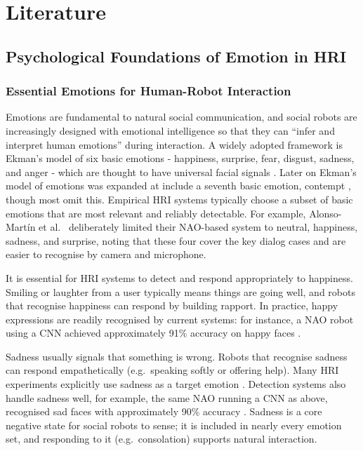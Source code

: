 \chapter{Literature}

\section{Psychological Foundations of Emotion in HRI}

\subsection{Essential Emotions for Human-Robot Interaction}

Emotions are fundamental to natural social communication, and social robots are increasingly designed with emotional intelligence so that they can ``infer and interpret human emotions'' during interaction. A widely adopted framework is Ekman's model of six basic emotions - happiness, surprise, fear, disgust, sadness, and anger - which are thought to have universal facial signals \cite{Reyes2019-go}. Later on Ekman's model of emotions was expanded at include a seventh basic emotion, contempt \cite{Matsumoto1992-jf}, though most omit this. Empirical HRI systems typically choose a subset of basic emotions that are most relevant and reliably detectable. For example, Alonso-Martín et al.\ \cite{Alonso-Martin2013-cv} deliberately limited their NAO-based system to neutral, happiness, sadness, and surprise, noting that these four cover the key dialog cases and are easier to recognise by camera and microphone.

It is essential for HRI systems to detect and respond appropriately to happiness. Smiling or laughter from a user typically means things are going well, and robots that recognise happiness can respond by building rapport. In practice, happy expressions are readily recognised by current systems: for instance, a NAO robot using a CNN achieved approximately 91\% accuracy on happy faces \cite{Filippini2021-ni}.

Sadness usually signals that something is wrong. Robots that recognise sadness can respond empathetically (e.g.\ speaking softly or offering help). Many HRI experiments explicitly use sadness as a target emotion \cite{Stock-Homburg2022-wd}. Detection systems also handle sadness well, for example, the same NAO running a CNN as above, recognised sad faces with approximately 90\% accuracy \cite{Filippini2021-ni}. Sadness is a core negative state for social robots to sense; it is included in nearly every emotion set, and responding to it (e.g.\ consolation) supports natural interaction.

